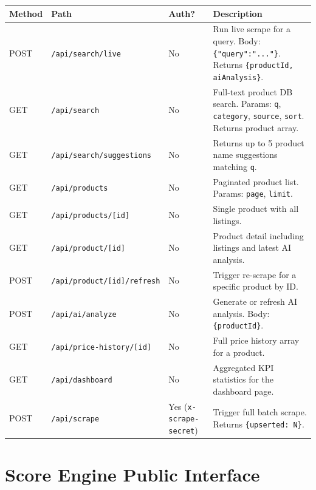 \documentclass[12pt,a4paper]{report}
\begin{document}
\begin{longtable}{L{1.2cm} L{4.5cm} L{2.5cm} L{5cm}}
  \toprule
  \textbf{Method} & \textbf{Path} & \textbf{Auth?} & \textbf{Description} \\
  \midrule
  \endhead
  POST & \texttt{/api/search/live} & No &
    Run live scrape for a query. Body: \texttt{\{"query":"..."\}}.
    Returns \texttt{\{productId, aiAnalysis\}}. \\[3pt]
  GET & \texttt{/api/search} & No &
    Full-text product DB search. Params: \texttt{q}, \texttt{category},
    \texttt{source}, \texttt{sort}. Returns product array. \\[3pt]
  GET & \texttt{/api/search/suggestions} & No &
    Returns up to 5 product name suggestions matching \texttt{q}. \\[3pt]
  GET & \texttt{/api/products} & No &
    Paginated product list. Params: \texttt{page}, \texttt{limit}. \\[3pt]
  GET & \texttt{/api/products/[id]} & No &
    Single product with all listings. \\[3pt]
  GET & \texttt{/api/product/[id]} & No &
    Product detail including listings and latest AI analysis. \\[3pt]
  POST & \texttt{/api/product/[id]/refresh} & No &
    Trigger re-scrape for a specific product by ID. \\[3pt]
  POST & \texttt{/api/ai/analyze} & No &
    Generate or refresh AI analysis. Body: \texttt{\{productId\}}. \\[3pt]
  GET & \texttt{/api/price-history/[id]} & No &
    Full price history array for a product. \\[3pt]
  GET & \texttt{/api/dashboard} & No &
    Aggregated KPI statistics for the dashboard page. \\[3pt]
  POST & \texttt{/api/scrape} &
    Yes (\texttt{x-scrape-secret}) &
    Trigger full batch scrape. Returns \texttt{\{upserted: N\}}. \\
  \bottomrule
\end{longtable}

\section{Score Engine Public Interface}
\end{document}

